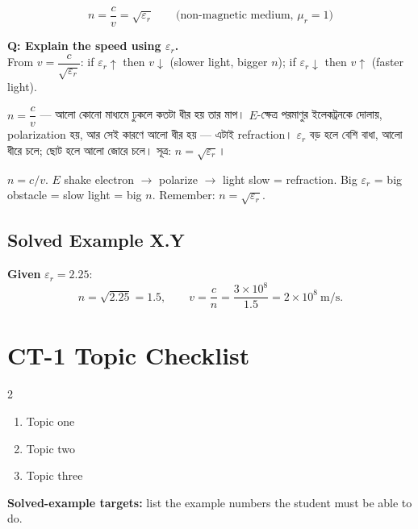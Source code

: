 \begin{formbox}
\[
n=\frac{c}{v}=\sqrt{\varepsilon_r}\qquad\text{(non-magnetic medium, } \mu_r=1)
\]
\end{formbox}

\begin{exambox}
\textbf{Q: Explain the speed using $\varepsilon_r$.}\\
From $v=\dfrac{c}{\sqrt{\varepsilon_r}}$: if $\varepsilon_r\!\uparrow$ then $v\!\downarrow$
(slower light, bigger $n$); if $\varepsilon_r\!\downarrow$ then $v\!\uparrow$ (faster light).
\end{exambox}

\begin{banglabox}
$n=\dfrac{c}{v}$ — আলো কোনো মাধ্যমে ঢুকলে কতটা ধীর হয় তার মাপ। $E$-ক্ষেত্র পরমাণুর ইলেকট্রনকে
দোলায়, polarization হয়, আর সেই কারণে আলো ধীর হয় — এটাই refraction। $\varepsilon_r$ বড় হলে
বেশি বাধা, আলো ধীরে চলে; ছোট হলে আলো জোরে চলে। সূত্র: $n=\sqrt{\varepsilon_r}$।
\end{banglabox}

\begin{cavebox}
$n=c/v$. $E$ shake electron $\rightarrow$ polarize $\rightarrow$ light slow = refraction.
Big $\varepsilon_r$ = big obstacle = slow light = big $n$. Remember: $n=\sqrt{\varepsilon_r}$.
\end{cavebox}

\subsection{Solved Example X.Y}
\textbf{Given} $\varepsilon_r=2.25$:
\[
n=\sqrt{2.25}=1.5,\qquad v=\frac{c}{n}=\frac{3\times10^{8}}{1.5}=2\times10^{8}\ \mathrm{m/s}.
\]


\section*{\color{ink}CT-1 Topic Checklist}
\begin{tcolorbox}[colback=softgrey, colframe=ink, boxrule=0.7pt, arc=3pt]
\begin{multicols}{2}
\begin{enumerate}
  \item Topic one
  \item Topic two
  \item Topic three
\end{enumerate}
\end{multicols}
\textbf{Solved-example targets:} list the example numbers the student must be able to do.
\end{tcolorbox}
